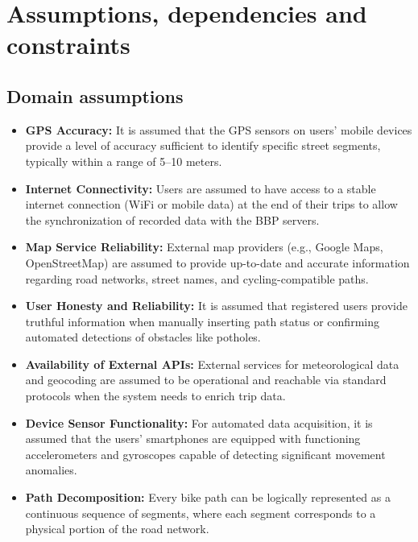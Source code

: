 \section{Assumptions, dependencies and constraints}

\subsection{Domain assumptions}
\begin{itemize}
    \item \textbf{GPS Accuracy:} It is assumed that the GPS sensors on users' mobile devices provide a level of accuracy sufficient to identify specific street segments, typically within a range of 5--10 meters.
    \item \textbf{Internet Connectivity:} Users are assumed to have access to a stable internet connection (WiFi or mobile data) at the end of their trips to allow the synchronization of recorded data with the BBP servers.
    \item \textbf{Map Service Reliability:} External map providers (e.g., Google Maps, OpenStreetMap) are assumed to provide up-to-date and accurate information regarding road networks, street names, and cycling-compatible paths.
    \item \textbf{User Honesty and Reliability:} It is assumed that registered users provide truthful information when manually inserting path status or confirming automated detections of obstacles like potholes.
    \item \textbf{Availability of External APIs:} External services for meteorological data and geocoding are assumed to be operational and reachable via standard protocols when the system needs to enrich trip data.
    \item \textbf{Device Sensor Functionality:} For automated data acquisition, it is assumed that the users' smartphones are equipped with functioning accelerometers and gyroscopes capable of detecting significant movement anomalies.
    \item \textbf{Path Decomposition:} Every bike path can be logically represented as a continuous sequence of segments, where each segment corresponds to a physical portion of the road network.
\end{itemize}